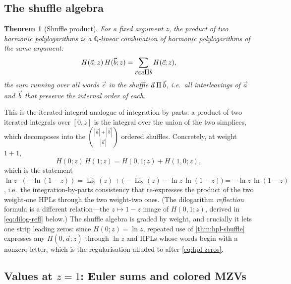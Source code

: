 \documentclass[11pt]{article}
\DeclareMathOperator{\Li}{Li}
\newcommand{\shuffle}{\mathbin{\rotatebox[origin=c]{180}{\ensuremath{\amalg}}}}
\theoremstyle{plain}
\newtheorem{theorem}{Theorem}
\theoremstyle{remark}
\begin{document}
\subsection{The shuffle algebra}

\begin{theorem}[Shuffle product]\label{thm:hpl-shuffle}
For a fixed argument $z$, the product of two harmonic polylogarithms is a $\mathbb{Q}$-linear combination of harmonic polylogarithms of the same argument:
\[
  H(\vec a;z)\,H(\vec b;z)=\sum_{\vec c\in \vec a\shuffle \vec b}H(\vec c;z),
\]
the sum running over all words $\vec c$ in the shuffle $\vec a\shuffle\vec b$, i.e.\ all interleavings of $\vec a$ and $\vec b$ that preserve the internal order of each.
\end{theorem}

This is the iterated-integral analogue of integration by parts: a product of two iterated integrals over $[0,z]$ is the integral over the union of the two simplices, which decomposes into the $\binom{|\vec a|+|\vec b|}{|\vec a|}$ ordered shuffles. Concretely, at weight $1+1$,
\begin{equation}\label{eq:hpl-shuffle-ex}
  H(0;z)\,H(1;z)=H(0,1;z)+H(1,0;z),
\end{equation}
which is the statement $\ln z\cdot(-\ln(1-z))=\Li_2(z)+\bigl(-\Li_2(z)-\ln z\,\ln(1-z)\bigr)=-\ln z\,\ln(1-z)$, i.e.\ the integration-by-parts consistency that re-expresses the product of the two weight-one HPLs through the two weight-two ones. (The dilogarithm \emph{reflection} formula is a different relation---the $z\mapsto1-z$ image of $H(0,1;z)$, derived in \eqref{eq:dilog-refl} below.) The shuffle algebra is graded by weight, and crucially it lets one strip leading zeros: since $H(0;z)=\ln z$, repeated use of \eqref{thm:hpl-shuffle} expresses any $H(0,\vec a;z)$ through $\ln z$ and HPLs whose words begin with a nonzero letter, which is the regularisation alluded to after \eqref{eq:hpl-zeros}.

\subsection{Values at \texorpdfstring{$z=1$}{z=1}: Euler sums and colored MZVs}
\end{document}
